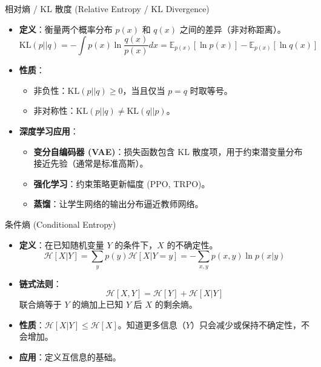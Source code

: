 \documentclass[12pt, aspectratio=169]{beamer}
\newcommand{\E}{\mathbb{E}}
\newcommand{\KL}{\text{KL}}
\newcommand{\mcH}{\mathcal{H}}
\begin{document}
\begin{frame}{相对熵 / KL 散度 (Relative Entropy / KL Divergence)}
    \begin{itemize}
        \item \textbf{定义}：衡量两个概率分布 $p(x)$ 和 $q(x)$ 之间的差异（非对称距离）。
        $$ \KL(p||q) = -\int p(x) \ln \frac{q(x)}{p(x)} dx = \E_{p(x)}[\ln p(x)] - \E_{p(x)}[\ln q(x)] $$
        \item \textbf{性质}：
        \begin{itemize}
            \item 非负性：$\KL(p||q) \ge 0$，当且仅当 $p=q$ 时取等号。
            \item 非对称性：$\KL(p||q) \neq \KL(q||p)$。
        \end{itemize}
        \item \textbf{深度学习应用}：
        \begin{itemize}
            \item \textbf{变分自编码器 (VAE)}：损失函数包含 KL 散度项，用于约束潜变量分布接近先验（通常是标准高斯）。
            \item \textbf{强化学习}：约束策略更新幅度 (PPO, TRPO)。
            \item \textbf{蒸馏}：让学生网络的输出分布逼近教师网络。
        \end{itemize}
    \end{itemize}
\end{frame}

\begin{frame}{条件熵 (Conditional Entropy)}
    \begin{itemize}
        \item \textbf{定义}：在已知随机变量 $Y$ 的条件下，$X$ 的不确定性。
        $$ \mcH[X|Y] = \sum_y p(y) \mcH[X|Y=y] = -\sum_{x,y} p(x,y) \ln p(x|y) $$
        \item \textbf{链式法则}：
        $$ \mcH[X, Y] = \mcH[Y] + \mcH[X|Y] $$
        联合熵等于 $Y$ 的熵加上已知 $Y$ 后 $X$ 的剩余熵。
        \item \textbf{性质}：$\mcH[X|Y] \le \mcH[X]$。知道更多信息（$Y$）只会减少或保持不确定性，不会增加。
        \item \textbf{应用}：定义互信息的基础。
    \end{itemize}
\end{frame}
\end{document}
